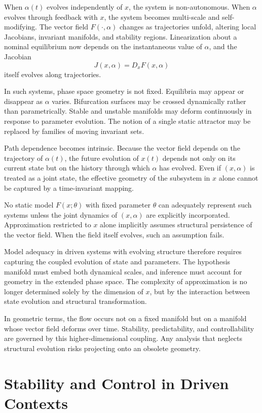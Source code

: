 \documentclass[12pt]{book}
\begin{document}
When $\alpha(t)$ evolves independently of $x$, the system is non-autonomous. When $\alpha$ evolves through feedback with $x$, the system becomes multi-scale and self-modifying. The vector field $F(\cdot,\alpha)$ changes as trajectories unfold, altering local Jacobians, invariant manifolds, and stability regions. Linearization about a nominal equilibrium now depends on the instantaneous value of $\alpha$, and the Jacobian
\[
J(x,\alpha) = D_x F(x,\alpha)
\]
itself evolves along trajectories.

In such systems, phase space geometry is not fixed. Equilibria may appear or disappear as $\alpha$ varies. Bifurcation surfaces may be crossed dynamically rather than parametrically. Stable and unstable manifolds may deform continuously in response to parameter evolution. The notion of a single static attractor may be replaced by families of moving invariant sets.

Path dependence becomes intrinsic. Because the vector field depends on the trajectory of $\alpha(t)$, the future evolution of $x(t)$ depends not only on its current state but on the history through which $\alpha$ has evolved. Even if $(x,\alpha)$ is treated as a joint state, the effective geometry of the subsystem in $x$ alone cannot be captured by a time-invariant mapping.

No static model $F(x;\theta)$ with fixed parameter $\theta$ can adequately represent such systems unless the joint dynamics of $(x,\alpha)$ are explicitly incorporated. Approximation restricted to $x$ alone implicitly assumes structural persistence of the vector field. When the field itself evolves, such an assumption fails.

Model adequacy in driven systems with evolving structure therefore requires capturing the coupled evolution of state and parameters. The hypothesis manifold must embed both dynamical scales, and inference must account for geometry in the extended phase space. The complexity of approximation is no longer determined solely by the dimension of $x$, but by the interaction between state evolution and structural transformation.

In geometric terms, the flow occurs not on a fixed manifold but on a manifold whose vector field deforms over time. Stability, predictability, and controllability are governed by this higher-dimensional coupling. Any analysis that neglects structural evolution risks projecting onto an obsolete geometry.

\section{Stability and Control in Driven Contexts}
\end{document}
